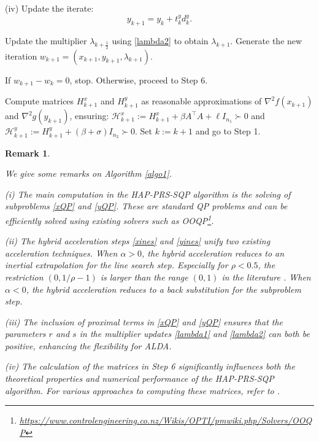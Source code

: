 \documentclass[pdflatex,sn-mathphys-num]{sn-jnl}%
\theoremstyle{thmstyleone}%
\theoremstyle{thmstyletwo}%
\newtheorem{remark}{Remark}%
\theoremstyle{thmstylethree}%
\begin{document}
\begin{algorithm}[]
(iv) Update the iterate:
\begin{equation}\label{newy}
y_{k+1}=y_{k}+t_{k}^{y} d_{k}^{y}.
\end{equation}

 Update the multiplier $\lambda_{k+\frac{1}{2}}$ using \eqref{lambda2} to obtain $\lambda_{k+1}$. Generate the new iteration $w_{k+1}=(x_{k+1}, y_{k+1},\lambda_{k+1})$.

 If $w_{k+1}-w_k=0$, stop. Otherwise, proceed to Step 6.

 Compute matrices $H_{k+1}^x$ and $H_{k+1}^y$ as reasonable approximations of $\nabla ^2 f (x_{k+1})$ and $\nabla ^2 g (y_{k+1})$, ensuring: $\mathcal{H}_{k+1}^x:=H_{k+1}^x+\beta A^{\top}A+\ell I_{n_1}\succ 0$ and $\mathcal{H}_{k+1}^y:=H_{k+1}^y+(\beta +\sigma) I_{n_2}\succ 0$. Set $k:= k+1$ and go to Step 1.
\end{algorithm}

\begin{remark}\label{rem2}{\rm We give some remarks on Algorithm \ref{algo1}.

(i) The main computation in the HAP-PRS-SQP algorithm is the solving of subproblems \eqref{xQP} and \eqref{yQP}. These are standard QP problems and can be efficiently solved using existing solvers such as OOQP\footnote{\href{https://www.controlengineering.co.nz/Wikis/OPTI/pmwiki.php/Solvers/OOQP}{https://www.controlengineering.co.nz/Wikis/OPTI/pmwiki.php/Solvers/OOQP}}. 

(ii) The hybrid acceleration steps \eqref{xines} and \eqref{yines} unify two existing acceleration techniques. When $\alpha>0$, the hybrid acceleration reduces to an inertial extrapolation \cite{AA01} for the line search step. Especially for $\rho<0.5$, the restriction $(0, 1/\rho-1)$ is larger than the range $(0,1)$ in the literature \cite{DLL17,CCM15,PS17,GCH20,WSL23}. When $\alpha<0$, the hybrid acceleration reduces to a back substitution \cite{HTY12} for the subproblem step.

(iii) The inclusion of proximal terms in \eqref{xQP} and \eqref{yQP} ensures that the parameters $r$ and $s$ in the multiplier updates \eqref{lambda1} and \eqref{lambda2} can both be positive, enhancing the flexibility for ALDA.

(iv) The calculation of the matrices in Step 6 significantly influences both the theoretical properties and numerical performance of the HAP-PRS-SQP algorithm. For various approaches to computing these matrices, refer to \cite{JZY20,JLY21}. 
}\end{remark}
\end{document}
